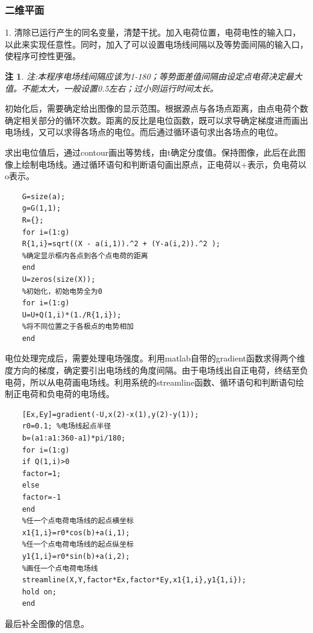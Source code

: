 \documentclass[UTF8]{article}
\numberwithin{figure}{subsection}
\numberwithin{table}{subsection}
\newtheorem{remark}{\indent 注}[subsection]
\begin{document}
\begin{multicols}{2}
	\subsubsection{二维平面}
	\par 1. 清除已运行产生的同名变量，清楚干扰。加入电荷位置，电荷电性的输入口，以此来实现任意性。同时，加入了可以设置电场线间隔以及等势面间隔的输入口，使程序可控性更强。
	\begin{remark} 注:本程序电场线间隔应该为1-180；等势面差值间隔由设定点电荷决定最大值。不能太大，一般设置0.5左右；过小则运行时间太长。
	\end{remark}
	\par 初始化后，需要确定给出图像的显示范围。根据源点与各场点距离，由点电荷个数确定相关部分的循环次数。距离的反比是电位函数，既可以求导确定梯度进而画出电场线，又可以求得各场点的电位。而后通过循环语句求出各场点的电位。
	\par 求出电位值后，通过contour画出等势线，由t确定分度值。保持图像，此后在此图像上绘制电场线。通过循环语句和判断语句画出原点，正电荷以+表示，负电荷以o表示。
	\begin{lstlisting}
    G=size(a);
    g=G(1,1);
    R={};
    for i=(1:g) 
    R{1,i}=sqrt((X - a(i,1)).^2 + (Y-a(i,2)).^2 );
    %确定显示框内各点到各个点电荷的距离
    end
    U=zeros(size(X));
    %初始化，初始电势全为0
    for i=(1:g)
    U=U+Q(1,i)*(1./R{1,i});
    %将不同位置之于各极点的电势相加
    end
	\end{lstlisting}
	\par 电位处理完成后，需要处理电场强度。利用matlab自带的gradient函数求得两个维度方向的梯度，确定要引出电场线的角度间隔。由于电场线出自正电荷，终结至负电荷，所以从电荷画电场线。利用系统的streamline函数、循环语句和判断语句绘制正电荷和负电荷的电场线。
	\begin{lstlisting}
    [Ex,Ey]=gradient(-U,x(2)-x(1),y(2)-y(1));
    r0=0.1; %电场线起点半径
    b=(a1:a1:360-a1)*pi/180;
    for i=(1:g) 
    if Q(1,i)>0
    factor=1;
    else
    factor=-1
    end
    %任一个点电荷电场线的起点横坐标
    x1{1,i}=r0*cos(b)+a(i,1);
    %任一个点电荷电场线的起点纵坐标
    y1{1,i}=r0*sin(b)+a(i,2);
    %画任一个点电荷电场线
    streamline(X,Y,factor*Ex,factor*Ey,x1{1,i},y1{1,i});
    hold on;
    end
	\end{lstlisting}
	\par 最后补全图像的信息。

\end{multicols}
\end{document}
